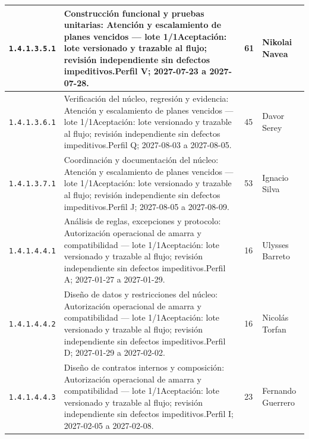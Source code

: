 \begin{longtable}{L{29mm}L{80mm}R{12mm}L{28mm}}
\texttt{1.\allowbreak{}4.\allowbreak{}1.\allowbreak{}3.\allowbreak{}5.\allowbreak{}1} & Construcción funcional y pruebas unitarias: Atención y escalamiento de planes vencidos — lote 1/1\newline Aceptación: lote versionado y trazable al flujo; revisión independiente sin defectos impeditivos.\newline Perfil V; 2027-07-23 a 2027-07-28. & 61 & Nikolai Navea\\\hline
\texttt{1.\allowbreak{}4.\allowbreak{}1.\allowbreak{}3.\allowbreak{}6.\allowbreak{}1} & Verificación del núcleo, regresión y evidencia: Atención y escalamiento de planes vencidos — lote 1/1\newline Aceptación: lote versionado y trazable al flujo; revisión independiente sin defectos impeditivos.\newline Perfil Q; 2027-08-03 a 2027-08-05. & 45 & Davor Serey\\\hline
\texttt{1.\allowbreak{}4.\allowbreak{}1.\allowbreak{}3.\allowbreak{}7.\allowbreak{}1} & Coordinación y documentación del núcleo: Atención y escalamiento de planes vencidos — lote 1/1\newline Aceptación: lote versionado y trazable al flujo; revisión independiente sin defectos impeditivos.\newline Perfil J; 2027-08-05 a 2027-08-09. & 53 & Ignacio Silva\\\hline
\texttt{1.\allowbreak{}4.\allowbreak{}1.\allowbreak{}4.\allowbreak{}4.\allowbreak{}1} & Análisis de reglas, excepciones y protocolo: Autorización operacional de amarra y compatibilidad — lote 1/1\newline Aceptación: lote versionado y trazable al flujo; revisión independiente sin defectos impeditivos.\newline Perfil A; 2027-01-27 a 2027-01-29. & 16 & Ulysses Barreto\\\hline
\texttt{1.\allowbreak{}4.\allowbreak{}1.\allowbreak{}4.\allowbreak{}4.\allowbreak{}2} & Diseño de datos y restricciones del núcleo: Autorización operacional de amarra y compatibilidad — lote 1/1\newline Aceptación: lote versionado y trazable al flujo; revisión independiente sin defectos impeditivos.\newline Perfil D; 2027-01-29 a 2027-02-02. & 16 & Nicolás Torfan\\\hline
\texttt{1.\allowbreak{}4.\allowbreak{}1.\allowbreak{}4.\allowbreak{}4.\allowbreak{}3} & Diseño de contratos internos y composición: Autorización operacional de amarra y compatibilidad — lote 1/1\newline Aceptación: lote versionado y trazable al flujo; revisión independiente sin defectos impeditivos.\newline Perfil I; 2027-02-05 a 2027-02-08. & 23 & Fernando Guerrero\\\hline

\end{longtable}
